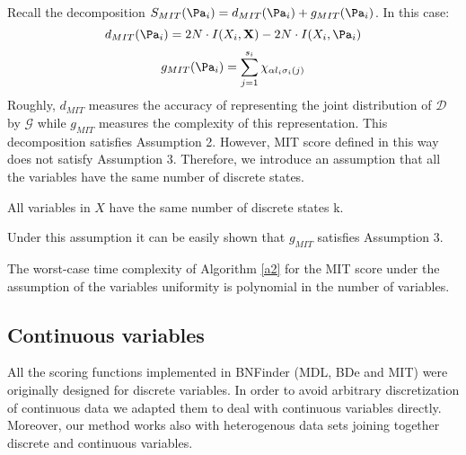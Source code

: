 Recall the decomposition $ S_{MIT}(\Pa_i) = d_{MIT}(\Pa_i) + g_{MIT}(\Pa_i) $. 
In this case:  
$$ d_{MIT}(\Pa_i) = 2N\cdot I(X_i, \mathbf{X}) - 2N \cdot I(X_i, \Pa_i) $$
$$ g_{MIT}(\Pa_i) = \sum_{j=1}^{s_i} \chi_{\alpha l_i \sigma_i(j)} $$ 
Roughly, $d_{MIT}$ measures the accuracy of representing the joint distribution of 
$\mathcal{D}$ by $\mathcal{G}$ while $g_{MIT}$ measures the complexity of this representation. This decomposition
satisfies Assumption 2.
However, MIT score defined in this way does not satisfy Assumption 3.
Therefore, we introduce an assumption that all the variables have the same number of discrete states.

\begin{ass}[uniformity]\label{as4}
 All variables in $X$ have the same number of discrete states k.
\end{ass}

Under this assumption it can be easily shown that $g_{MIT}$ satisfies Assumption 3.
 \begin{theorem} \cite{globMITManual}
 The worst-case time complexity of Algorithm \ref{a2} for the MIT score under the assumption of the variables uniformity is polynomial in the number of variables. 
 \end{theorem}


\subsection{Continuous variables}

All the scoring functions implemented in BNFinder (MDL, BDe and MIT) 
were originally designed for discrete variables.
In order to avoid arbitrary discretization of continuous data 
we adapted them to deal with continuous variables directly. 
Moreover, our method works also with heterogenous data sets 
joining together discrete and continuous variables.


